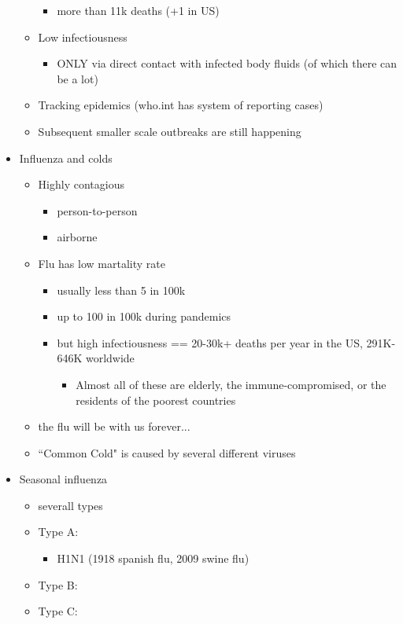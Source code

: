 \documentclass{article}
\theoremstyle{definition}
\begin{document}
\begin{itemize}
\begin{itemize}
\begin{itemize}
					\item more than 11k deaths (+1 in US)
				\end{itemize}
			\item Low infectiousness
				\begin{itemize}
					\item ONLY via direct contact with infected body fluids (of which there can be a lot)
				\end{itemize}
			\item Tracking epidemics (who.int has system of reporting cases)
			\item Subsequent smaller scale outbreaks are still happening
		\end{itemize}
	\item Influenza and colds
		\begin{itemize}
			\item Highly contagious
				\begin{itemize}
					\item person-to-person
					\item airborne
				\end{itemize}
			\item Flu has low martality rate
				\begin{itemize}
					\item usually less than 5 in 100k
					\item up to 100 in 100k during pandemics
					\item but high infectiousness == 20-30k+ deaths per year in the US, 291K-646K worldwide
						\begin{itemize}
							\item Almost all of these are elderly, the immune-compromised, or the residents of the poorest countries
						\end{itemize}
				\end{itemize}
			\item the flu will be with us forever...
			\item ``Common Cold" is caused by several different viruses
		\end{itemize}
	\item Seasonal influenza
		\begin{itemize}
			\item severall types
			\item Type A:
				\begin{itemize}
					\item H1N1 (1918 spanish flu, 2009 swine flu)
				\end{itemize}
			\item Type B:
			\item Type C:
		\end{itemize}
\end{itemize}
\end{document}
